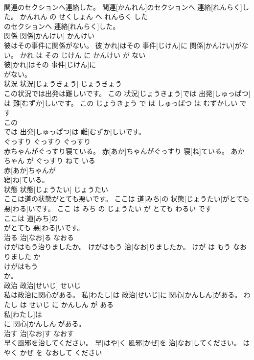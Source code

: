 \documentclass[8pt]{extreport}
\begin{document}
\begin{CJK}{UTF8}{min}
\\	関連のセクションへ連絡した。	関連[かんれん]のセクションへ 連絡[れんらく]した。	かんれん の せくしょん へ れんらく した	
\\	のセクションへ 連絡[れんらく]した。		
\\	関係	関係[かんけい]	かんけい	
\\	彼はその事件に関係がない。	彼[かれ]はその 事件[じけん]に 関係[かんけい]がない。	かれ は その じけん に かんけい が ない	
\\	彼[かれ]はその 事件[じけん]に
\\	がない。		
\\	状況	状況[じょうきょう]	じょうきょう	
\\	この状況では出発は難しいです。	この 状況[じょうきょう]では 出発[しゅっぱつ]は 難[むずか]しいです。	この じょうきょう で は しゅっぱつ は むずかしい です	
\\	この
\\	では 出発[しゅっぱつ]は 難[むずか]しいです。		
\\	ぐっすり	ぐっすり	ぐっすり	
\\	赤ちゃんがぐっすり寝ている。	赤[あか]ちゃんがぐっすり 寝[ね]ている。	あかちゃん が ぐっすり ねて いる	
\\	赤[あか]ちゃんが
\\	寝[ね]ている。		
\\	状態	状態[じょうたい]	じょうたい	
\\	ここは道の状態がとても悪いです。	ここは 道[みち]の 状態[じょうたい]がとても 悪[わる]いです。	ここ は みち の じょうたい が とても わるい です	
\\	ここは 道[みち]の
\\	がとても 悪[わる]いです。		
\\	治る	治[なお]る	なおる	
\\	けがはもう治りましたか。	けがはもう 治[なお]りましたか。	けが は もう なおりました か	
\\	けがはもう
\\	か。		
\\	政治	政治[せいじ]	せいじ	
\\	私は政治に関心がある。	私[わたし]は 政治[せいじ]に 関心[かんしん]がある。	わたし は せいじ に かんしん が ある	
\\	私[わたし]は
\\	に 関心[かんしん]がある。		
\\	治す	治[なお]す	なおす	
\\	早く風邪を治してください。	早[はや]く 風邪[かぜ]を 治[なお]してください。	はやく かぜ を なおして ください	

\end{CJK}
\end{document}
